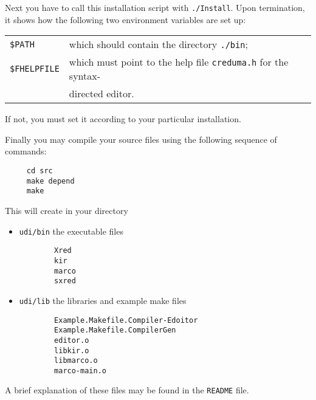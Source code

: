 Next you have to call this installation script with {\tt ./Install}. Upon termination,
it shows how the following two environment variables are set up:
\begin{tabular}{ll}
{\tt \$PATH} & which should contain the directory {\tt ./bin};\\
{\tt \$FHELPFILE} & which must point to the help file {\tt creduma.h}
for the syntax-\\ & directed editor.\\
\end{tabular}
If not, you must set it according to your particular installation.

Finally you may compile your source files using the following sequence of commands:
\begin{verbatim}
     cd src
     make depend
     make
\end{verbatim}

\noindent This will create in your directory
\begin{itemize}
\item  {\tt udi/bin} the executable files
\begin{verbatim}
        Xred
        kir
        marco
        sxred
\end{verbatim}
\item {\tt udi/lib} the libraries and example make files
\begin{verbatim}
        Example.Makefile.Compiler-Edoitor
        Example.Makefile.CompilerGen
        editor.o
        libkir.o
        libmarco.o
        marco-main.o
\end{verbatim}
\end{itemize}
\noindent A brief explanation of these files may be found in the {\tt README} file.  
